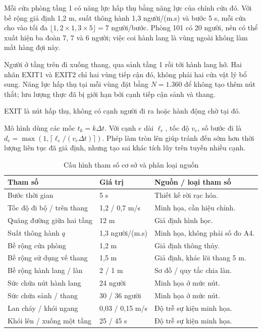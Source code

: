 Mỗi cửa phòng tầng 1 có năng lực hấp thụ bằng năng lực của chính cửa đó. Với bề rộng giả định 1,2 m, suất thông hành 1,3 người/(m.s) và bước 5 s, mỗi cửa cho vào tối đa $\lfloor1{,}2\times1{,}3\times5\rfloor=7$ người/bước. Phòng 101 có 20 người, nên có thể xuất hiện ba đoàn 7, 7 và 6 người; việc coi hành lang là vùng ngoài không làm mất hàng đợi này.

Người ở tầng trên đi xuống thang, qua sảnh tầng 1 rồi tới hành lang hở. Hai nhãn EXIT1 và EXIT2 chỉ hai vùng tiếp cận đó, không phải hai cửa vật lý bổ sung. Năng lực hấp thụ tại mỗi vùng đặt bằng $N=1.360$ để không tạo thêm nút thắt; lưu lượng thực đã bị giới hạn bởi cạnh tiếp cận sảnh và thang.

EXIT là nút hấp thụ, không có cạnh người đi ra hoặc hành động chờ tại đó.

Mô hình dùng các mốc $t_k=k\Delta t$. Với cạnh $e$ dài $\ell_e$, tốc độ $v_e$, số bước đi là $d_e=\max(1,\lceil\ell_e/(v_e\Delta t)\rceil)$. Phép làm tròn lên giúp tránh đến sớm hơn thời lượng liên tục đã giả định, nhưng tạo sai khác tích lũy trên tuyến nhiều cạnh.

\begin{table}[htbp]\centering\caption{Cấu hình tham số cơ sở và phân loại nguồn}
\small\begin{tabularx}{\linewidth}{P{5.1cm}P{2.7cm}X}\toprule
Tham số & Giá trị & Nguồn / loại tham số\\\midrule
Bước thời gian & 5 s & Thiết kế rời rạc hóa.\\
Tốc độ đi bộ / trên thang & 1,2 / 0,7 m/s & Minh họa, cần hiệu chỉnh.\\
Quãng đường giữa hai tầng & 12 m & Giả định hình học.\\
Suất thông hành $q$ & 1,3 người/(m.s) & Minh họa, không phải số đo A4.\\
Bề rộng cửa phòng & 1,2 m & Giả định thông thủy.\\
Bề rộng sử dụng vế thang & 1,5 m & Giả định, khác lõi thang 5 m.\\
Bề rộng hành lang / làn & 2 / 1 m & Sơ đồ / quy tắc chia làn.\\
Sức chứa nút hành lang & 24 người & Minh họa ở mức nút.\\
Sức chứa sảnh / thang & 30 / 36 người & Minh họa ở mức nút.\\
Lan cháy / khói ngang & 0,03 / 0,15 m/s & Độ trễ sự kiện minh họa.\\
Khói lên / xuống một tầng & 25 / 45 s & Độ trễ sự kiện minh họa.\\\bottomrule
\end{tabularx}\end{table}

